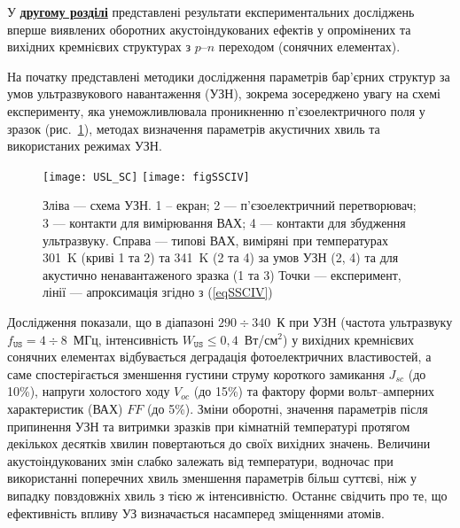 У  \underline{\textbf{другому розділі}} представлені результати експериментальних досліджень вперше виявлених оборотних акустоіндукованих ефектів у опромінених та вихідних кремнієвих структурах з  $p$--$n$ переходом (сонячних елементах).

На початку представлені методики дослідження параметрів бар'єрних структур за умов ультразвукового навантаження (УЗН),
зокрема зосереджено увагу на схемі експерименту, яка унеможливлювала проникненню п'єзоелектричного поля у зразок (рис.~\ref{USL_SC}), методах визначення параметрів акустичних хвиль та використаних режимах УЗН.


\begin{figure}[b]
\center
\texttt{[image: USL\_SC]} \hfill
\texttt{[image: figSSCIV]}
\caption{\label{USL_SC}
Зліва --- схема УЗН.
1 --  екран;
2 --- п'єзоелектричний перетворювач;
3 --- контакти для вимірювання ВАХ;
4 --- контакти для збудження ультразвуку.
Справа --- типові ВАХ, виміряні при температурах 301~K (криві 1 та 2) та 341~K (2 та 4)
за умов УЗН (2, 4) та для акустично ненавантаженого зразка (1 та 3)
Точки --- експеримент, лінії --- апроксимація згідно з (\ref{eqSSCIV})
}%
\end{figure}

 Дослідження показали, що 
   в діапазоні $290\div340$~К при УЗН (частота ультразвуку $f_\mathtt{US}=4\div8$~МГц, інтенсивність $W_\mathtt{US}\leq0,4$~Вт/см$^2$) у вихідних кремнієвих сонячних елементах  відбувається деградація
фотоелектричних властивостей, а саме
спостерігається зменшення густини струму короткого замикання $J_{sc}$ (до 10\%), напруги холостого ходу $V_{oc}$ (до 15\%) та фактору форми вольт--амперних характеристик (ВАХ) $F\!F$ (до 5\%).
Зміни оборотні, значення параметрів  після припинення УЗН  та витримки зразків при кімнатній температурі протягом декількох десятків хвилин повертаються до своїх вихідних значень.
Величини акустоіндукованих змін слабко залежать від температури, водночас при використанні поперечних хвиль зменшення параметрів більш суттєві, ніж у випадку повздовжніх хвиль з тією ж інтенсивністю.
Останнє свідчить про те, що ефективність впливу УЗ визначається насамперед зміщеннями атомів.


